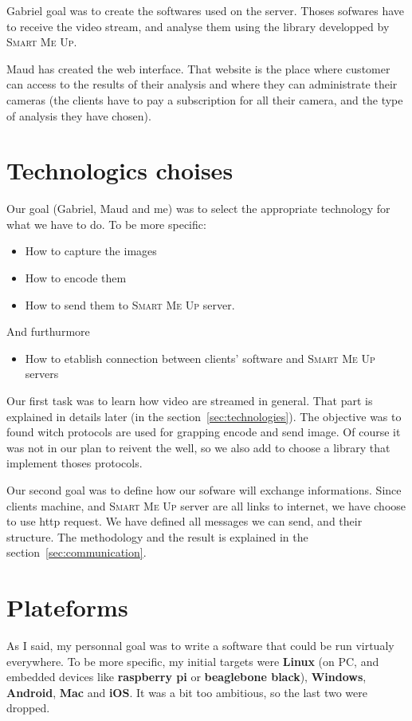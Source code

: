 \documentclass[a4paper,11pt]{custom}
\newcommand{\smu}{\textsc{Smart Me Up}}
\newcommand{\rpi}{\textbf{raspberry pi}\xspace}
\newcommand{\bbb}{\textbf{beaglebone black}\xspace}
\newcommand{\linux}{\textbf{Linux}\xspace}
\newcommand{\win}{\textbf{Windows}\xspace}
\newcommand{\mac}{\textbf{Mac}\xspace}
\newcommand{\android}{\textbf{Android}\xspace}
\newcommand{\ios}{\textbf{iOS}\xspace}
\begin{document}
Gabriel goal was to create the softwares used on the server. Thoses sofwares
have to receive the video stream, and analyse them using the library developped
by \smu.

Maud has created the web interface. That website is the place where customer can
access to the results of their analysis and where they can administrate their
cameras (the clients have to pay a subscription for all their camera, and the
type of analysis they have chosen).

\section{Technologics choises}

Our goal (Gabriel, Maud and me) was to select the appropriate technology for
what we have to do. To be more specific:
\begin{itemize}
\item How to capture the images
\item How to encode them
\item How to send them to \smu{} server.
\end{itemize}

And furthurmore
\begin{itemize}
\item How to etablish connection between clients' software and \smu{} servers
\end{itemize}

Our first task was to learn how video are streamed in general. That part is
explained in details later (in the section~\ref{sec:technologies}). The objective
was to found witch protocols are used for grapping encode and send image. Of
course it was not in our plan to reivent the well, so we also add to choose a
library that implement thoses protocols.

Our second goal was to define how our sofware will exchange informations. Since
clients machine, and \smu{} server are all links to internet, we have choose to
use http request. We have defined all messages we can send, and their
structure. The methodology and the result is explained in the
section~\ref{sec:communication}.

\section{Plateforms}

As I said, my personnal goal was to write a software that could be run virtualy
everywhere. To be more specific, my initial targets were \linux{} (on PC, and
embedded devices like \rpi or \bbb), \win, \android, \mac{} and \ios. It was a
bit too ambitious, so the last two were dropped.
\end{document}
